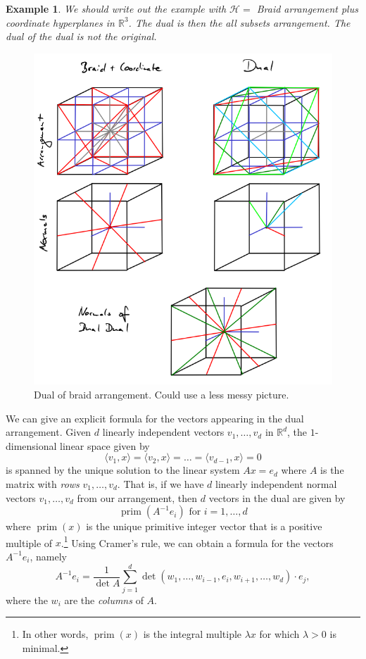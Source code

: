 \documentclass[11pt,letter]{amsart}
\newtheorem{example}[definition]{Example}
\newcommand{\RR}{\mathbb{R}}
\newcommand{\sprod}[2]{\langle #1, #2 \rangle}
\begin{document}
\begin{example}

We should write out the example with $\mathcal{H} = $ Braid arrangement
plus coordinate hyperplanes in $\mathbb{R}^3$.  The dual is then the
all subsets arrangement.  The dual of the dual is not the original.

\end{example}

\begin{figure}
\includegraphics[width=12cm]{duality}
\caption{Dual of braid arrangement. Could use a less messy picture.}
\end{figure}

We can give an explicit formula for the vectors appearing in the dual arrangement. Given $d$ linearly independent vectors $v_1,\ldots,v_{d}$ in $\RR^d$, the $1$-dimensional linear space given by
\[
  \sprod{v_1}{x} = \sprod{v_2}{x} = \ldots = \sprod{v_{d-1}}{x} = 0
\]
is spanned by the unique solution to the linear system $Ax=e_d$ where $A$ is the matrix with \emph{rows} $v_1,\ldots,v_d$. That is, if we have $d$ linearly independent normal vectors $v_1,\ldots,v_d$ from our arrangement, then $d$ vectors in the dual are given by
\[
  \operatorname{prim}(A^{-1} e_i) \text{ for } i=1,\ldots,d
\]
where $\operatorname{prim}(x)$ is the unique primitive integer vector that is a  positive multiple of $x$.\footnote{In other words, $\operatorname{prim}(x)$ is the integral multiple $\lambda x$ for which $\lambda> 0$ is minimal.} Using Cramer's rule, we can obtain a formula for the vectors $A^{-1}e_i$, namely
\[
  A^{-1}e_i = \frac{1}{\det A}\sum_{j=1}^d \det(w_1,\ldots,w_{i-1},e_i,w_{i+1},\ldots, w_d)\cdot e_j,
\]
where the $w_i$ are the \emph{columns} of $A$.
\end{document}
